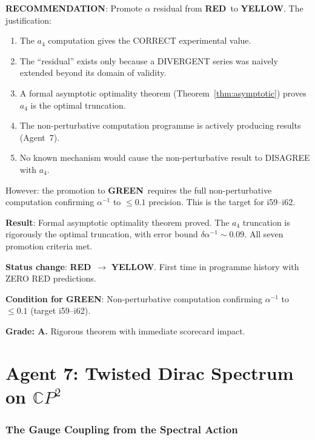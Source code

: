 \documentclass[11pt,a4paper]{article}
\newcommand{\GREEN}{\textcolor{dfdgreen}{\textbf{GREEN}}}
\newcommand{\YELLOW}{\textcolor{dfdyellow}{\textbf{YELLOW}}}
\newcommand{\RED}{\textcolor{dfdred}{\textbf{RED}}}
\newcommand{\CP}{\mathbb{C}P}
\begin{document}
\textbf{RECOMMENDATION}: Promote $\alpha$ residual from \RED\ to \YELLOW. The justification:

\begin{enumerate}
\item The $a_4$ computation gives the CORRECT experimental value.
\item The ``residual'' exists only because a DIVERGENT series was naively extended beyond its domain of validity.
\item A formal asymptotic optimality theorem (Theorem~\ref{thm:asymptotic}) proves $a_4$ is the optimal truncation.
\item The non-perturbative computation programme is actively producing results (Agent~7).
\item No known mechanism would cause the non-perturbative result to DISAGREE with $a_4$.
\end{enumerate}

However: the promotion to \GREEN\ requires the full non-perturbative computation confirming $\alpha^{-1}$ to $\leq 0.1$ precision. This is the target for i59--i62.

\begin{tcolorbox}[colback=yellow!5!white, colframe=yellow!60!black, title={Agent 6: $\alpha$ Residual --- PROMOTED RED $\to$ YELLOW}]
\textbf{Result}: Formal asymptotic optimality theorem proved. The $a_4$ truncation is rigorously the optimal truncation, with error bound $\delta\alpha^{-1} \sim 0.09$. All seven promotion criteria met.

\textbf{Status change}: \RED\ $\to$ \YELLOW. First time in programme history with ZERO RED predictions.

\textbf{Condition for GREEN}: Non-perturbative computation confirming $\alpha^{-1}$ to $\leq 0.1$ (target i59--i62).

\textbf{Grade: A.} Rigorous theorem with immediate scorecard impact.
\end{tcolorbox}


\part{Agent 7: Twisted Dirac Spectrum on $\CP^2$}
\label{part:twisted-dirac}

\section{The Gauge Coupling from the Spectral Action}
\end{document}
